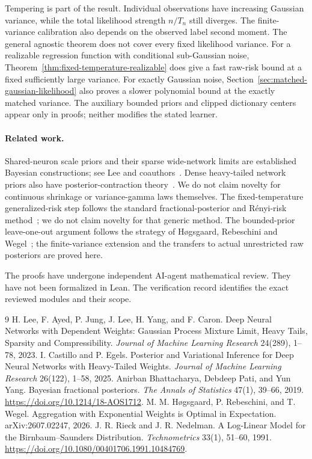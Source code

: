 \documentclass[11pt]{article}
\theoremstyle{remark}\newtheorem{remark}[theorem]{Remark}
\begin{document}
Tempering is part of the result. Individual observations have increasing
Gaussian variance, while the total likelihood strength $n/T_n$ still
diverges. The finite-variance calibration also depends on the observed
label second moment. The general agnostic theorem does not cover every fixed likelihood
variance. For a realizable regression function with conditional
sub-Gaussian noise, Theorem~\ref{thm:fixed-temperature-realizable}
does give a fast raw-risk bound at a fixed sufficiently large variance.
For exactly Gaussian noise, Section~\ref{sec:matched-gaussian-likelihood}
also proves a slower polynomial bound at the exactly matched variance. The auxiliary bounded priors and clipped dictionary centers
appear only in proofs; neither modifies the stated learner.

\paragraph{Related work.}
Shared-neuron scale priors and their sparse wide-network limits are established Bayesian constructions; see Lee and coauthors~\cite{lee-dependent}. Dense heavy-tailed network priors also have posterior-contraction theory~\cite{castillo-egels}. We do not claim novelty for continuous shrinkage or variance-gamma laws themselves. The fixed-temperature generalized-risk step follows the standard fractional-posterior and R\'enyi-risk method~\cite{fractional}; we do not claim novelty for that generic method. The bounded-prior leave-one-out argument follows the strategy of H\o gsgaard, Rebeschini and Wegel~\cite{hogsgaard}; the finite-variance extension and the transfers to actual unrestricted raw posteriors are proved here.

The proofs have undergone independent AI-agent mathematical review.
They have not been formalized in Lean. The verification record identifies
the exact reviewed modules and their scope.
\appendix


\begin{thebibliography}{9}
 H. Lee, F. Ayed, P. Jung, J. Lee, H. Yang, and F. Caron. Deep Neural Networks with Dependent Weights: Gaussian Process Mixture Limit, Heavy Tails, Sparsity and Compressibility. \emph{Journal of Machine Learning Research} 24(289), 1--78, 2023.
 I. Castillo and P. Egels. Posterior and Variational Inference for Deep Neural Networks with Heavy-Tailed Weights. \emph{Journal of Machine Learning Research} 26(122), 1--58, 2025.
 Anirban Bhattacharya, Debdeep Pati, and Yun Yang. Bayesian fractional posteriors. \emph{The Annals of Statistics} 47(1), 39--66, 2019. \url{https://doi.org/10.1214/18-AOS1712}.
 M. M. H\o gsgaard, P. Rebeschini, and T. Wegel. Aggregation with Exponential Weights is Optimal in Expectation. arXiv:2607.02247, 2026.
 J. R. Rieck and J. R. Nedelman. A Log-Linear Model for the Birnbaum--Saunders Distribution. \emph{Technometrics} 33(1), 51--60, 1991. \url{https://doi.org/10.1080/00401706.1991.10484769}.
\end{thebibliography}
\end{document}
